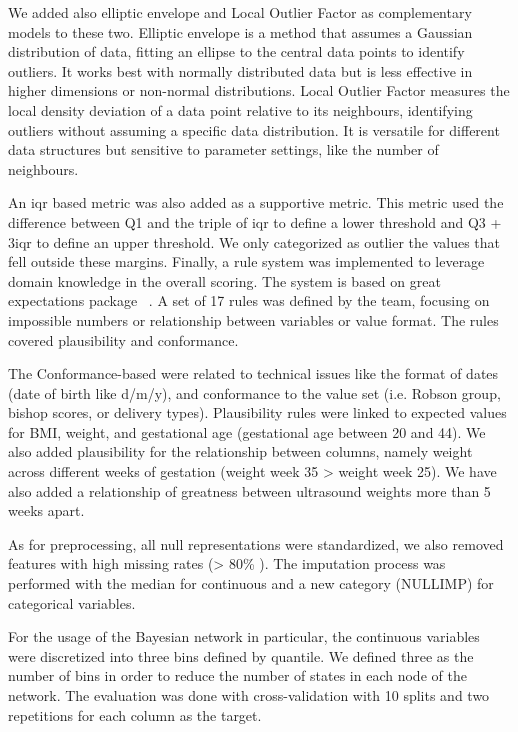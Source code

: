 We added also elliptic envelope and Local Outlier Factor as complementary models to these two. Elliptic envelope is a method that assumes a Gaussian distribution of data, fitting an ellipse to the central data points to identify outliers. It works best with normally distributed data but is less effective in higher dimensions or non-normal distributions. Local Outlier Factor measures the local density deviation of a data point relative to its neighbours, identifying outliers without assuming a specific data distribution. It is versatile for different data structures but sensitive to parameter settings, like the number of neighbours. 

An \ac{iqr} based metric was also added as a supportive metric. This metric used the difference between Q1 and the triple of \ac{iqr} to define a lower threshold and Q3 + 3\ac{iqr} to define an upper threshold. We only categorized as outlier the values that fell outside these margins. Finally, a rule system was implemented to leverage domain knowledge in the overall scoring. The system is based on great expectations package \unskip~\cite{GXProactiveCollaborative}. A set of 17 rules was defined by the team, focusing on impossible numbers or relationship between variables  or value format. The rules covered plausibility and conformance. 

The Conformance-based were related to technical issues like the format of dates (date of birth like d/m/y), and conformance to the value set (i.e. Robson group, bishop scores, or delivery types). Plausibility rules were linked to expected values for BMI, weight, and gestational age (gestational age between 20 and 44). We also added plausibility for the relationship between columns, namely weight across different weeks of gestation (weight week 35 {\textgreater} weight week 25). We have also added a relationship of greatness between ultrasound weights more than 5 weeks apart. 

As for preprocessing, all null representations were standardized, we also removed features with high missing rates ({\textgreater} 80\% ). The imputation process was performed with the median for continuous and a new category (NULLIMP) for categorical variables.

For the usage of the Bayesian network in particular, the continuous variables were discretized into three bins defined by quantile. We defined three as the number of bins in order to reduce the number of states in each node of the network. The evaluation was done with cross-validation with 10 splits and two repetitions for each column as the target.

